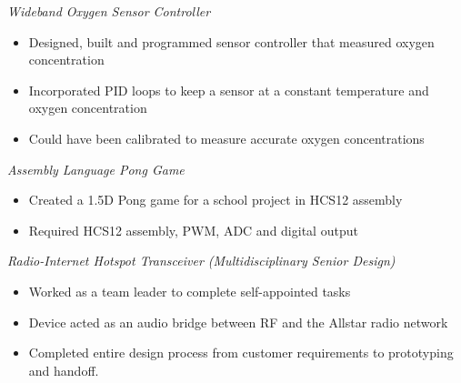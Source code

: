 \documentclass[line,margin]{res}
\begin{document}
\begin{resume}
	\vspace{-10pt}
	{\sl Wideband Oxygen Sensor Controller}
		\begin{itemize} \itemsep -2pt
			\item Designed, built and programmed sensor controller that measured oxygen concentration
			\item Incorporated PID loops to keep a sensor at a constant temperature and oxygen concentration
			\item Could have been calibrated to measure accurate oxygen concentrations
		\end{itemize}


	\vspace{-10pt}
	{\sl Assembly Language Pong Game}
		\begin{itemize} \itemsep -2pt
			\item Created a 1.5D Pong game for a school project in HCS12 assembly
			\item Required HCS12 assembly, PWM, ADC and digital output
		\end{itemize}
	\vspace{-10pt}
	{\sl Radio-Internet Hotspot Transceiver (Multidisciplinary Senior Design)}
		\begin{itemize} \itemsep -2pt
			\item Worked as a team leader to complete self-appointed tasks
			\item Device acted as an audio bridge between RF and the Allstar radio network
			\item Completed entire design process from customer requirements to prototyping and handoff.
		\end{itemize}

\end{resume}
\end{document}
